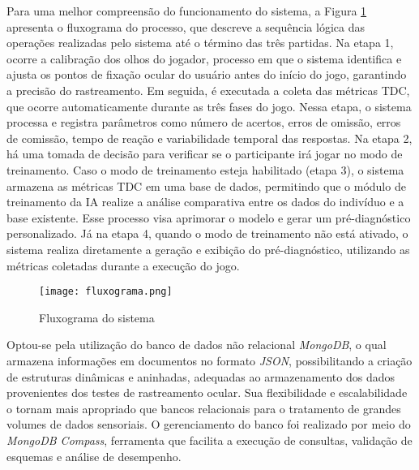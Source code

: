 Para uma melhor compreensão do funcionamento do sistema, a Figura \ref{fig:fluxograma} apresenta o fluxograma do processo, que descreve a sequência lógica das operações realizadas pelo sistema até o término das três partidas. Na etapa 1, ocorre a calibração dos olhos do jogador, processo em que o sistema identifica e ajusta os pontos de fixação ocular do usuário antes do início do jogo, garantindo a precisão do rastreamento. Em seguida, é executada a coleta das métricas TDC, que ocorre automaticamente durante as três fases do jogo. Nessa etapa, o sistema processa e registra parâmetros como número de acertos, erros de omissão, erros de comissão, tempo de reação e variabilidade temporal das respostas. Na etapa 2, há uma tomada de decisão para verificar se o participante irá jogar no modo de treinamento. Caso o modo de treinamento esteja habilitado (etapa 3), o sistema armazena as métricas TDC em uma base de dados, permitindo que o módulo de treinamento da IA realize a análise comparativa entre os dados do indivíduo e a base existente. Esse processo visa aprimorar o modelo e gerar um pré-diagnóstico personalizado. Já na etapa 4, quando o modo de treinamento não está ativado, o sistema realiza diretamente a geração e exibição do pré-diagnóstico, utilizando as métricas coletadas durante a execução do jogo.

\begin{figure}[H]
    \centering
    \caption{Fluxograma do sistema}%
    \label{fig:fluxograma}
    \texttt{[image: fluxograma.png]}%
\end{figure}

Optou-se pela utilização do banco de dados não relacional \textit{MongoDB}, o qual armazena informações em documentos no formato \textit{JSON}, possibilitando a criação de estruturas dinâmicas e aninhadas, adequadas ao armazenamento dos dados provenientes dos testes de rastreamento ocular. Sua flexibilidade e escalabilidade o tornam mais apropriado que bancos relacionais para o tratamento de grandes volumes de dados sensoriais. O gerenciamento do banco foi realizado por meio do \textit{MongoDB Compass}, ferramenta que facilita a execução de consultas, validação de esquemas e análise de desempenho.
